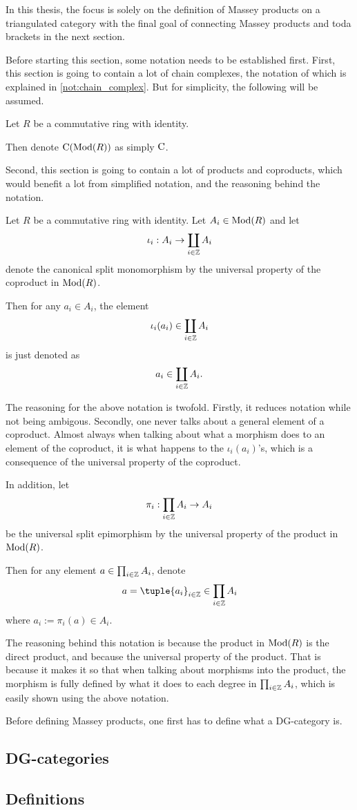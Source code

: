 In this thesis, the focus is solely on the definition of Massey products on a triangulated category with the final goal of connecting Massey products and toda brackets in the next section.

Before starting this section, some notation needs to be established first. First, this section is going to contain a lot of chain complexes, the notation of which is explained in \autoref{not:chain_complex}. But for simplicity, the following will be assumed.
\begin{notation}
    Let \( R \) be a commutative ring with identity.

    Then denote \( \operatorname{C}(\operatorname{Mod}(R)) \) as simply \( \operatorname{C} \).
\end{notation}

Second, this section is going to contain a lot of products and coproducts, which would benefit a lot from simplified notation, and the reasoning behind the notation.

\begin{notation}
    Let \( R \) be a commutative ring with identity. Let \( A_i \in \operatorname{Mod}(R) \) and let
    \[
        \iota_i: A_i \to \coprod_{i \in {\mathbb{Z}}} A_i
    \]
    denote the canonical split monomorphism by the universal property of the coproduct in \( \operatorname{Mod}(R) \).

    Then for any \( a_i \in A_i \), the element
    \[
        \iota_i(a_i) \in \coprod_{i \in {\mathbb{Z}}} A_i
    \]
    is just denoted as
    \[
        a_i \in \coprod_{i \in {\mathbb{Z}}} A_i.
    \]
    
    The reasoning for the above notation is twofold. Firstly, it reduces notation while not being ambigous. Secondly, one never talks about a general element of a coproduct. Almost always when talking about what a morphism does to an element of the coproduct, it is what happens to the \( \iota_i(a_i) \)'s, which is a consequence of the universal property of the coproduct.

    In addition, let 
    \[
        \pi_i: \prod_{i \in {\mathbb{Z}}} A_i \to A_i
    \]
    be the universal split epimorphism by the universal property of the product in \( \operatorname{Mod}(R) \).
    
    Then for any element \( a \in \prod_{i \in {\mathbb{Z}}} A_i \), denote
    \[
        a = \tuple{a_i}_{i \in \Zb} \in \prod_{i \in \Zb} A_i
    \]
    where \( a_i := \pi_i(a) \in A_i \).
    
    The reasoning behind this notation is because the product in \( \operatorname{Mod}(R) \) is the direct product, and because the universal property of the product. That is because it makes it so that when talking about morphisms into the product, the morphism is fully defined by what it does to each degree in \( \prod_{i \in {\mathbb{Z}}} A_i \), which is easily shown using the above notation.
\end{notation}

Before defining Massey products, one first has to define what a DG-category is.

\subsection{DG-categories}


\subsection{Definitions}

